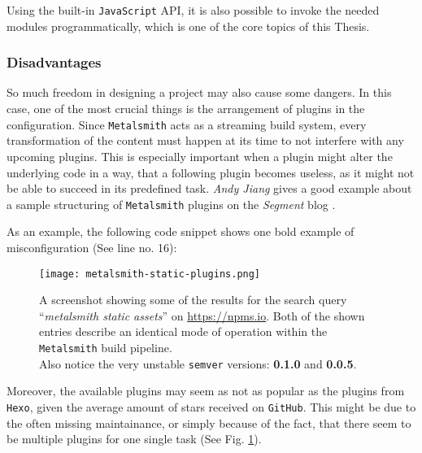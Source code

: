 Using the built-in \texttt{JavaScript} API, it is also possible to invoke the needed modules programmatically, which is one of the core topics of this Thesis.

\subsubsection{Disadvantages}
So much freedom in designing a project may also cause some dangers. In this case, one of the most crucial things is the arrangement of plugins in the configuration. Since \texttt{Metalsmith} acts as a streaming build system, every transformation of the content must happen at its time to not interfere with any upcoming plugins. This is especially important when a plugin might alter the underlying code in a way, that a following plugin becomes useless, as it might not be able to succeed in its predefined task. \emph{Andy Jiang} gives a good example about a sample structuring of \texttt{Metalsmith} plugins on the \emph{Segment} blog \cite{Metalsmith2015technicaldocumentation}.

As an example, the following code snippet shows one bold example of misconfiguration (See line no. 16):


\label{list:metalsmith}

\begin{figure}[b] %
    \centering
    \texttt{[image: metalsmith-static-plugins.png]}
    \caption{A screenshot showing some of the results for the search query ``\emph{metalsmith static assets}'' on \url{https://npms.io}. Both of the shown entries describe an identical mode of operation within the \texttt{Metalsmith} build pipeline.\\
    Also notice the very unstable \texttt{semver} versions: \textbf{0.1.0} and \textbf{0.0.5}.}
    \label{fig:metalsmith-plugins}
\end{figure}
%

Moreover, the available plugins may seem as not as popular as the plugins from \texttt{Hexo}, given the average amount of stars received on \texttt{GitHub}. This might be due to the often missing maintainance, or simply because of the fact, that there seem to be multiple plugins for one single task (See Fig. \ref{fig:metalsmith-plugins}).
